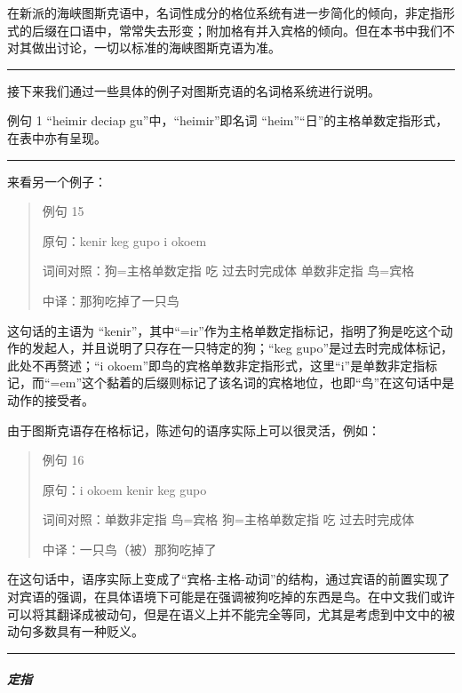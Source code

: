 \documentclass{article}
\begin{document}
在新派的海峡图斯克语中，名词性成分的格位系统有进一步简化的倾向，非定指形式的后缀在口语中，常常失去形变；附加格有并入宾格的倾向。但在本书中我们不对其做出讨论，一切以标准的海峡图斯克语为准。

\begin{center}\rule{0.5\linewidth}{0.5pt}\end{center}

接下来我们通过一些具体的例子对图斯克语的名词格系统进行说明。

例句 1 ``heimir deciap gu''中，``heimir''即名词
``heim''``日''的主格单数定指形式，在表中亦有呈现。

\begin{center}\rule{0.5\linewidth}{0.5pt}\end{center}

来看另一个例子：

\begin{quote}
例句 15

原句：kenir keg gupo i okoem

词间对照：狗=主格单数定指 吃 过去时完成体 单数非定指 鸟=宾格

中译：那狗吃掉了一只鸟
\end{quote}

这句话的主语为
``kenir''，其中``=ir''作为主格单数定指标记，指明了狗是吃这个动作的发起人，并且说明了只存在一只特定的狗；``keg
gupo''是过去时完成体标记，此处不再赘述；``i
okoem''即鸟的宾格单数非定指形式，这里``i''是单数非定指标记，而``=em''这个黏着的后缀则标记了该名词的宾格地位，也即``鸟''在这句话中是动作的接受者。

由于图斯克语存在格标记，陈述句的语序实际上可以很灵活，例如：

\begin{quote}
例句 16

原句：i okoem kenir keg gupo

词间对照：单数非定指 鸟=宾格 狗=主格单数定指 吃 过去时完成体

中译：一只鸟（被）那狗吃掉了
\end{quote}

在这句话中，语序实际上变成了``宾格-主格-动词''的结构，通过宾语的前置实现了对宾语的强调，在具体语境下可能是在强调被狗吃掉的东西是鸟。在中文我们或许可以将其翻译成被动句，但是在语义上并不能完全等同，尤其是考虑到中文中的被动句多数具有一种贬义。

\begin{center}\rule{0.5\linewidth}{0.5pt}\end{center}

\subparagraph{定指}\label{ux5b9aux6307}
\end{document}
